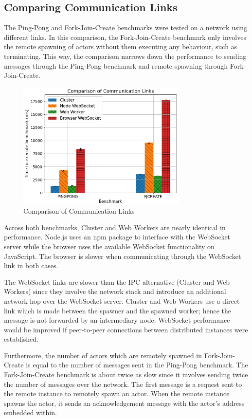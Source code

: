 \documentclass[oneside]{um-fict}
\begin{document}
\subsection{Comparing Communication Links}
The Ping-Pong and Fork-Join-Create benchmarks were tested on a network using different links. In this comparison, the Fork-Join-Create benchmark only involves the remote spawning of actors without them executing any behaviour, such as terminating. This way, the comparison narrows down the performance to sending messages through the Ping-Pong benchmark and remote spawning through Fork-Join-Create.
\begin{figure}[H]
    \begin{centering}
        \includegraphics[width=320px]{resources/link.png}
        \caption{Comparison of Communication Links}\label{fig:link}
    \end{centering}
\end{figure}
Across both benchmarks, Cluster and Web Workers are nearly identical in performance. Node.js uses an npm package to interface with the WebSocket server while the browser uses the available WebSocket functionality on JavaScript. The browser is slower when communicating through the WebSocket link in both cases. 

The WebSocket links are slower than the IPC alternative (Cluster and Web Workers) since they involve the network stack and introduce an additional network hop over the WebSocket server. Cluster and Web Workers use a direct link which is made between the spawner and the spawned worker; hence the message is not forwarded by an intermediary node. WebSocket performance would be improved if peer-to-peer connections between distributed instances were established.

Furthermore, the number of actors which are remotely spawned in Fork-Join-Create is equal to the number of messages sent in the Ping-Pong benchmark. The Fork-Join-Create benchmark is about twice as slow since it involves sending twice the number of messages over the network. The first message is a request sent to the remote instance to remotely spawn an actor. When the remote instance spawns the actor, it sends an acknowledgement message with the actor's address embedded within.
\end{document}
